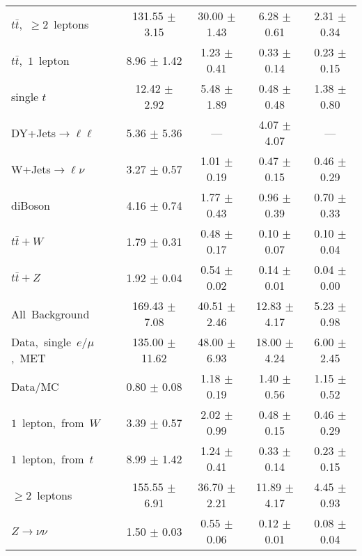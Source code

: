 \documentclass{article}
\begin{document}
\begin{longtable}{|l|c|c|c|c|}
$t\bar{t}$,~$\ge2$~leptons & 131.55 $\pm$ 3.15  & 30.00 $\pm$ 1.43  & 6.28 $\pm$ 0.61  & 2.31 $\pm$ 0.34 \\* 
$t\bar{t}$,~$1$~lepton & 8.96 $\pm$ 1.42  & 1.23 $\pm$ 0.41  & 0.33 $\pm$ 0.14  & 0.23 $\pm$ 0.15 \\* 
single $t$  & 12.42 $\pm$ 2.92  & 5.48 $\pm$ 1.89  & 0.48 $\pm$ 0.48  & 1.38 $\pm$ 0.80 \\* 
DY+Jets$\rightarrow\ell\ell$  & 5.36 $\pm$ 5.36  & ---  & 4.07 $\pm$ 4.07  & --- \\* 
W+Jets$\rightarrow\ell\nu$  & 3.27 $\pm$ 0.57  & 1.01 $\pm$ 0.19  & 0.47 $\pm$ 0.15  & 0.46 $\pm$ 0.29 \\* 
diBoson  & 4.16 $\pm$ 0.74  & 1.77 $\pm$ 0.43  & 0.96 $\pm$ 0.39  & 0.70 $\pm$ 0.33 \\* 
$t\bar{t}+W$  & 1.79 $\pm$ 0.31  & 0.48 $\pm$ 0.17  & 0.10 $\pm$ 0.07  & 0.10 $\pm$ 0.04 \\* 
$t\bar{t}+Z$  & 1.92 $\pm$ 0.04  & 0.54 $\pm$ 0.02  & 0.14 $\pm$ 0.01  & 0.04 $\pm$ 0.00 \\* 
\hline \hline 
All~Background  & 169.43 $\pm$ 7.08  & 40.51 $\pm$ 2.46  & 12.83 $\pm$ 4.17  & 5.23 $\pm$ 0.98 \\* 
Data,~single~$e/\mu$,~MET  & 135.00 $\pm$ 11.62  & 48.00 $\pm$ 6.93  & 18.00 $\pm$ 4.24  & 6.00 $\pm$ 2.45 \\* 
Data/MC  & 0.80 $\pm$ 0.08  & 1.18 $\pm$ 0.19  & 1.40 $\pm$ 0.56  & 1.15 $\pm$ 0.52 \\* 
\hline \hline 
$1$~lepton,~from~$W$  & 3.39 $\pm$ 0.57  & 2.02 $\pm$ 0.99  & 0.48 $\pm$ 0.15  & 0.46 $\pm$ 0.29 \\* 
$1$~lepton,~from~$t$  & 8.99 $\pm$ 1.42  & 1.24 $\pm$ 0.41  & 0.33 $\pm$ 0.14  & 0.23 $\pm$ 0.15 \\* 
$\ge2$~leptons  & 155.55 $\pm$ 6.91  & 36.70 $\pm$ 2.21  & 11.89 $\pm$ 4.17  & 4.45 $\pm$ 0.93 \\* 
$Z\rightarrow\nu\nu$  & 1.50 $\pm$ 0.03  & 0.55 $\pm$ 0.06  & 0.12 $\pm$ 0.01  & 0.08 $\pm$ 0.04 \\* 
\hline 
\end{longtable} 

 
 
 
 
\pagebreak 

 
 
 
 
\end{document}
